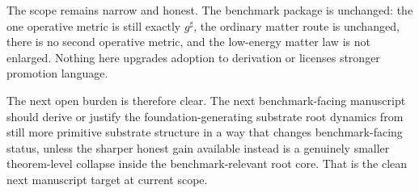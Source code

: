 \documentclass[11pt]{article}
\newcommand{\CompletedMetric}{g^{\sharp}}
\begin{document}
The scope remains narrow and honest. The benchmark package is unchanged: the one operative metric is still exactly \(\CompletedMetric\), the ordinary matter route is unchanged, there is no second operative metric, and the low-energy matter law is not enlarged. Nothing here upgrades adoption to derivation or licenses stronger promotion language.

The next open burden is therefore clear. The next benchmark-facing manuscript should derive or justify the foundation-generating substrate root dynamics from still more primitive substrate structure in a way that changes benchmark-facing status, unless the sharper honest gain available instead is a genuinely smaller theorem-level collapse inside the benchmark-relevant root core. That is the clean next manuscript target at current scope.
\end{document}
